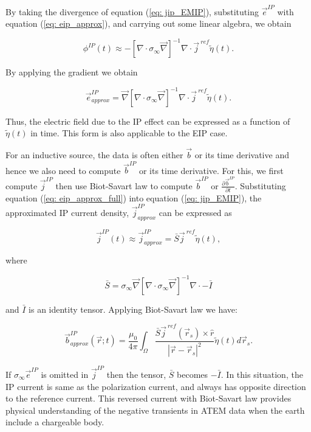 \documentclass[extra,mreferee]{gji}
\renewcommand{\div}{\nabla\cdot}
\newcommand{\grad}{\vec \nabla}
\newcommand{\siginf}{\sigma_\infty}
\renewcommand {\j}  { {\vec j} }
\renewcommand {\b}  { {\vec b} }
\newcommand {\e}  { {\vec e} }
\newcommand{\peta}{\tilde{\eta}}
\newcommand{\jref}{\j^{\ ref}}
\begin{document}
By taking the divergence of  equation (\ref{eq: jip_EMIP}), substituting  $\e^{IP}$ with equation (\ref{eq: eip_approx}), and carrying out some linear algebra, we obtain
\begin{linenomath*}
\begin{equation}
  \phi^{IP}(t) \approx -[\div \siginf\grad]^{-1}\div\jref\peta(t).
  \label{eq: phiIPapprox_general}
\end{equation}
\end{linenomath*}
By applying the gradient we obtain 
\begin{linenomath*}
\begin{equation}
    \e^{IP}_{approx} = \grad[\div \siginf\grad]^{-1}\div\jref\peta(t).
    \label{eq: eip_approx_full}
\end{equation}
\end{linenomath*}
Thus, the electric field due to the IP effect can be expressed as a function of $\peta(t)$ in time. 
This form is also applicable to the  EIP case.   

For an inductive source, the data is often either $\b$ or its time derivative and hence we also need to compute $\b^{IP}$ or its time derivative.
For this, we first compute $\j^{IP}$ then use Biot-Savart law to compute $\b^{IP}$ or $\frac{\partial \b^{IP}}{\partial t}$. 
Substituting equation (\ref{eq: eip_approx_full}) into equation (\ref{eq: jip_EMIP}), the approximated IP current density, $\j^{IP}_{approx}$ can be expressed as
\begin{linenomath*}
\begin{equation}
  \j^{IP}(t) \approx \j^{IP}_{approx} = \bar{S}\jref\peta(t),
  \label{eq: jip_approx}
\end{equation}
\end{linenomath*}
where
\begin{linenomath*}
\begin{equation}
  \bar{S} = \siginf\grad[\div \siginf\grad]^{-1}\div-\bar{I}
\end{equation}
\end{linenomath*}
and $\bar{I}$ is an identity tensor. 
Applying Biot-Savart law we have:
\begin{linenomath*}
\begin{equation}
  \b^{IP}_{approx}(\vec{r}; t) = \frac{\mu_0}{4\pi}\int_{\Omega}  \frac{\bar{S}\j^{\ ref}(\vec{r}_s)\times\hat{r}}{|\vec{r}-\vec{r}_s|^2}\peta(t)d\vec{r}_s.
  \label{eq: BiotbIP_approx}
\end{equation}
\end{linenomath*}
If $\siginf\e^{IP}$ is omitted in  $\j^{IP}$ then the tensor, $\bar{S}$ becomes $-\bar{I}$. 
In this situation, the IP current is same as the polarization current, and always has opposite direction to the reference current. 
This reversed current with Biot-Savart law provides physical understanding of the negative transients in ATEM data when the earth include a chargeable body. 
\end{document}
